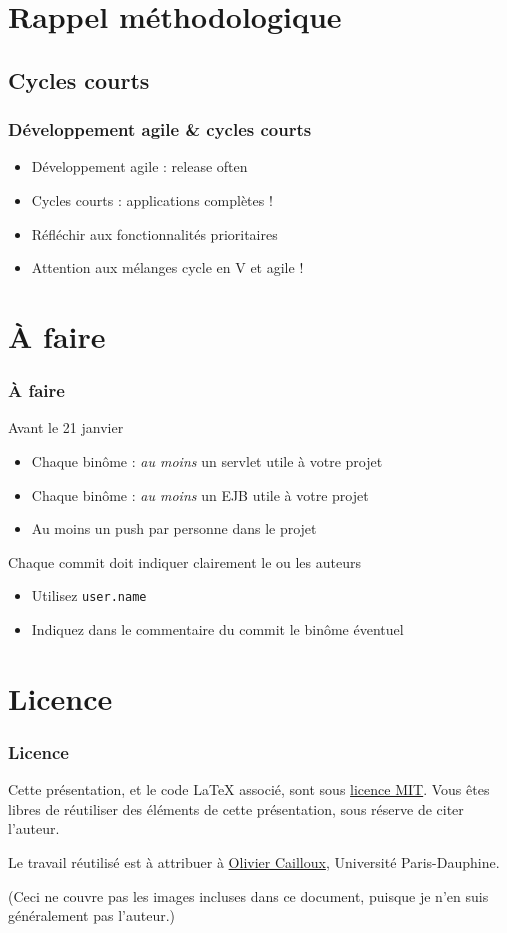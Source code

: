 \documentclass[english, french]{beamer}
\begin{document}
\section{Rappel méthodologique}
\subsection{Cycles courts}
\begin{frame}
	\frametitle{Développement agile \& cycles courts}
	\begin{itemize}
		\item Développement agile : release often
		\item Cycles courts : applications complètes !
		\item Réfléchir aux fonctionnalités prioritaires
		\item Attention aux mélanges cycle en V et agile !
	\end{itemize}
\end{frame}

\section{À faire}
\begin{frame}
	\frametitle{À faire}
	\begin{block}{Avant le 21 janvier}
		\begin{itemize}
			\item[+\footnote{Le + indique que cet aspect intervient dans la note}] Chaque binôme : \emph{au moins} un servlet utile à votre projet
			\item[+] Chaque binôme : \emph{au moins} un EJB utile à votre projet
			\item[+] Au moins un push par personne dans le projet
		\end{itemize}
	\end{block}
	Chaque commit doit indiquer clairement le ou les auteurs
	\begin{itemize}
		\item Utilisez \texttt{user.name}
		\item Indiquez dans le commentaire du commit le binôme éventuel
	\end{itemize}
\end{frame}

\appendix
\AtBeginSection{
}
\section{Licence}
\begin{frame}
	\frametitle{Licence}
	Cette présentation, et le code LaTeX associé, sont sous \href{http://opensource.org/licenses/MIT}{licence MIT}. Vous êtes libres de réutiliser des éléments de cette présentation, sous réserve de citer l’auteur.
	
	Le travail réutilisé est à attribuer à \href{http://www.lamsade.dauphine.fr/~ocailloux/}{Olivier Cailloux}, Université Paris-Dauphine.
	
	\small{(Ceci ne couvre pas les images incluses dans ce document, puisque je n’en suis généralement pas l’auteur.)}
\end{frame}
\end{document}
